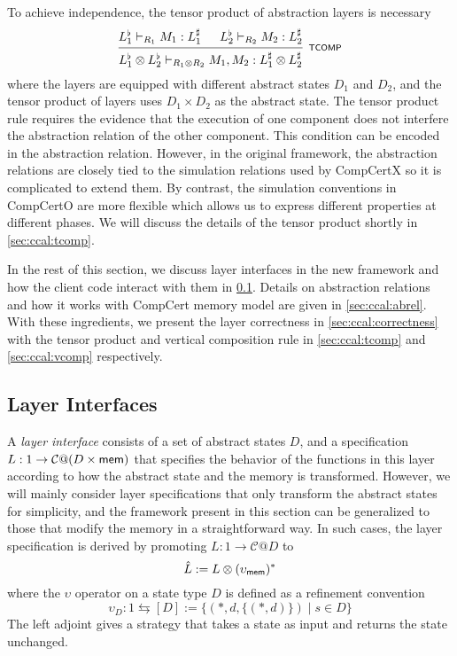 \documentclass[acmsmall,review,anonymous]{acmart}\settopmatter{printfolios=true,printccs=false,printacmref=false}
\begin{document}
To achieve independence,
the tensor product of abstraction layers
is necessary
\[
  \begin{prooftree}
    \hypo{L^\flat_1 \vdash_{R_1} M_1 : L^\sharp_1}
    \hypo{L^\flat_2 \vdash_{R_2} M_2 : L^\sharp_2}
    \infer2[\scriptsize\kw{TCOMP}]
    {L^\flat_1 \otimes L^\flat_2 \vdash_{R_1 \otimes R_2}
      M_1, M_2 : L^\sharp_1 \otimes L^\sharp_2}
  \end{prooftree}
\]
where the layers are equipped with
different abstract states $D_1$ and $D_2$,
and the tensor product of layers uses
$D_1 \times D_2$ as the abstract state.
The tensor product rule
requires the evidence that
the execution of one component
does not interfere the abstraction relation
of the other component.
This condition can be encoded
in the abstraction relation.
However,
in the original framework,
the abstraction relations
are closely tied to
the simulation relations used by CompCertX
so it is complicated to extend them.
By contrast,
the simulation conventions in CompCertO
are more flexible
which allows us to express
different properties at different phases.
We will discuss the details of the tensor product
shortly in \ref{sec:ccal:tcomp}.

In the rest of this section,
we discuss layer interfaces
in the new framework
and how the client code
interact with them in \ref{sec:ccal:interface}.
Details on abstraction relations
and how it works with CompCert memory model
are given in \ref{sec:ccal:abrel}.
With these ingredients,
we present the layer correctness in \ref{sec:ccal:correctness}
with the tensor product and vertical composition rule
in \ref{sec:ccal:tcomp} and \ref{sec:ccal:vcomp} respectively.


\subsection{Layer Interfaces} %
\label{sec:ccal:interface}



A \emph{layer interface}
consists of a set of abstract states $D$,
and a specification
$L: 1 \rightarrow \mathcal{C}@(D \times  \mathsf{mem} )$
that specifies the behavior of
the functions in this layer
according to how the abstract state and the memory
is transformed.
However,
we will mainly consider layer specifications
that only transform the abstract states
for simplicity,
and the framework present in this section can be generalized to
those that modify the memory in a straightforward way.
In such cases,
the layer specification
is derived by promoting
$L: 1\rightarrow \mathcal{C}@D$
to
\[
  \hat{L} := L \otimes (\upsilon_{ \mathsf{mem} })^*
\]
where the $\upsilon$ operator
on a state type $D$
is defined as a refinement convention
\[
  \upsilon_D : 1 \leftrightarrows [D] := \{ (*, d, \{(*, d)\}) \mid s \in D \}
\]
The left adjoint
gives a strategy that takes a state as input
and returns the state unchanged.
\end{document}
